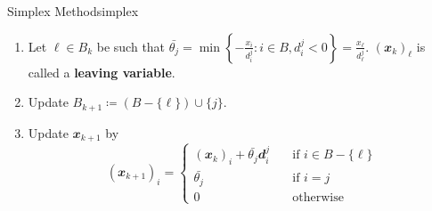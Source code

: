 \documentclass[math, code]{amznotes}
\theoremstyle{remark}
\begin{document}
\begin{tecbox}{Simplex Method}{simplex}
\begin{enumerate}
\begin{enumerate}
            \begin{enumerate}
                \item Let $\ell \in B_k$ be such that $\bar{\theta_j} = \min\left\{-\frac{x_i}{d^j_i} \colon i \in B, d^j_i < 0\right\} = \frac{x_{\ell}}{d^j_{\ell}}$. $\left(\mathbfit{x}_{k}\right)_{\ell}$ is called a {\color{red} \textbf{leaving variable}}.
                \item Update $B_{k + 1} \coloneqq (B - \{\ell\}) \cup \{j\}$.
                \item Update $\mathbfit{x}_{k + 1}$ by 
                \begin{equation*}
                    \left(\mathbfit{x}_{k + 1}\right)_i = \begin{cases}
                        \left(\mathbfit{x}_{k}\right)_i + \bar{\theta_j}\mathbfit{d}^j_i & \quad\textrm{if } i \in B - \{\ell\} \\
                        \bar{\theta_j} & \quad\textrm{if } i = j \\
                        0 & \quad\textrm{otherwise}
                    \end{cases}
                \end{equation*} 
            \end{enumerate}
        \end{enumerate}
    \end{enumerate}
\end{tecbox}
\end{document}
